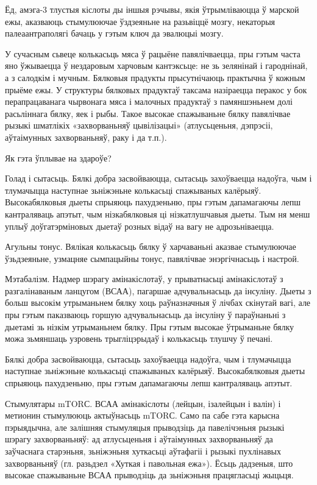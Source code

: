 Ёд, амэга-3 тлустыя кіслоты ды іншыя рэчывы, якія ўтрымліваюцца ў марской ежы, аказваюць стымулюючае ўздзеяньне на разьвіццё мозгу, некаторыя палеаантраполягі бачаць у гэтым ключ да эвалюцыі мозгу.

У сучасным сьвеце колькасьць мяса ў рацыёне павялічваецца, пры гэтым часта яно ўжываецца ў нездаровым харчовым кантэксьце: не зь зелянінай і гароднінай, а з салодкім і мучным. Бялковыя прадукты прысутнічаюць практычна ў кожным прыёме ежы. У структуры бялковых прадуктаў таксама назіраецца перакос у бок перапрацаванага чырвонага мяса і малочных прадуктаў з памяншэньнем долі расьліннага бялку, яек і рыбы. Такое высокае спажываньне бялку павялічвае рызыкі шматлікіх «захворваньняў цывілізацыі» (атлусьценьня, дэпрэсіі, аўтаімунных захворваньняў, раку і да т.п.).

Як гэта ўплывае на здароўе?

Голад і сытасьць.
Бялкі добра засвойваюцца, сытасьць захоўваецца надоўга, чым і тлумачыцца наступнае зьніжэньне колькасьці спажываных калёрыяў. Высокабялковыя дыеты спрыяюць пахудзеньню, пры гэтым дапамагаючы лепш кантраляваць апэтыт, чым нізкабялковыя ці нізкатлушчавыя дыеты. Тым ня менш уплыў доўгатэрміновых дыетаў розных відаў на вагу не адрозьніваецца.

Агульны тонус.
Вялікая колькасьць бялку ў харчаваньні аказвае стымулюючае ўзьдзеяньне, узмацняе сымпацыйны тонус, павялічвае энэргічнасьць і настрой.

Мэтабалізм.
Надмер шэрагу амінакіслотаў, у прыватнасьці амінакіслотаў з разгалінаваным ланцугом (ВСАА), пагаршае адчувальнасьць да інсуліну. Дыеты з больш высокім утрыманьнем бялку хоць раўназначныя ў лічбах скінутай вагі, але пры гэтым паказваюць горшую адчувальнасьць да інсуліну ў параўнаньні з дыетамі зь нізкім утрыманьнем бялку. Пры гэтым высокае ўтрыманьне бялку можа зьмяншаць узровень трыгліцэрыдаў і колькасьць тлушчу ў печані.

Бялкі добра засвойваюцца, сытасьць захоўваецца надоўга, чым і тлумачыцца наступнае зьніжэньне колькасьці спажываных калёрыяў. Высокабялковыя дыеты спрыяюць пахудзеньню, пры гэтым дапамагаючы лепш кантраляваць апэтыт.

Стымулятары mTORС.
ВСАА амінакіслоты (лейцын, ізалейцын і валін) і метионин стымулююць актыўнасьць mTORС. Само па сабе гэта карысна пэрыядычна, але залішняя стымуляцыя прыводзіць да павелічэньня рызыкі шэрагу захворваньняў: ад атлусьценьня і аўтаімунных захворваньняў да заўчаснага старэньня, зьніжэньня хуткасьці аўтафагіі і рызыкі пухлінавых захворваньняў (гл. разьдзел «Хуткая і павольная ежа»). Ёсьць дадзеныя, што высокае спажываньне ВСАА прыводзіць да зьніжэньня працягласьці жыцьця.

